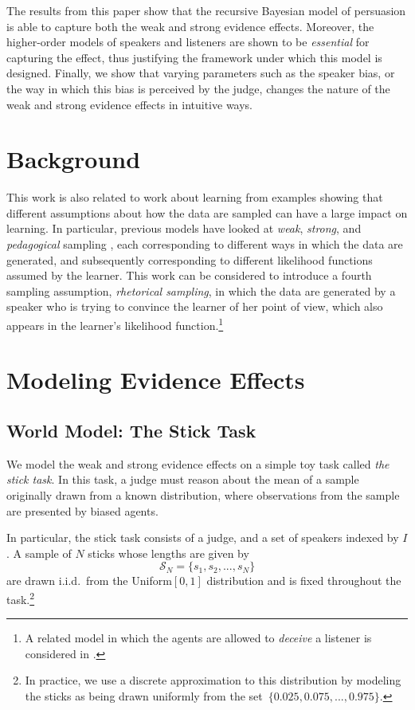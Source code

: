 \documentclass[10pt,letterpaper]{article}
\begin{document}
The results from this paper show that the recursive Bayesian model of persuasion is able to capture both the
weak and strong evidence effects. Moreover, the higher-order models of speakers and listeners are shown to
be \textit{essential} for capturing the effect, thus justifying the framework under which this model is designed. 
Finally, we show that varying parameters such as the speaker bias, or the way in which this bias is perceived by
the judge, changes the nature of the weak and strong evidence effects in intuitive ways.

\section{Background}
This work is also related to work about learning from examples showing that different assumptions
about how the data are sampled can have a large impact on learning. In particular, previous models have 
looked at \textit{weak}, \textit{strong}, and \textit{pedagogical} sampling 
\cite{hsu2009differential, shafto_rational_2014, tenenbaum1999bayesian, tenenbaum2001generalization}, each corresponding to different ways
in which the data are generated, and subsequently corresponding to different likelihood functions assumed by
the learner. This work can be considered to introduce a fourth sampling assumption, \textit{rhetorical sampling},
in which the data are generated by a speaker who is trying to convince the learner of her point of view, which
also appears in the learner's likelihood function.\footnote{A related model in which the agents are allowed to \textit{deceive}
a listener is considered in .	}

\section{Modeling Evidence Effects}
\subsection{World Model: The Stick Task}
We model the weak and strong evidence effects on a simple toy task called \textit{the stick task}.
In this task, a judge must reason about the mean of a sample originally drawn from a known distribution,
where observations from the sample are presented by biased agents.

In particular, the stick task consists of a judge, and a set of speakers indexed by $I$. 
A sample of $N$ sticks whose lengths are given by
\begin{equation}
\mathcal{S}_N = \{ s_1, s_2, ..., s_N \}
\end{equation}
are drawn i.i.d.\ from the Uniform$[0,1]$ distribution and is fixed throughout
the task.\footnote{In practice, we use a discrete approximation to this distribution 
by modeling the sticks as being drawn uniformly from the set~${\{ 0.025, 0.075, ..., 0.975\}}$.} 
\end{document}
